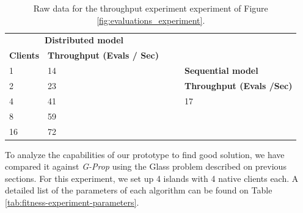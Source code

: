 \begin{table}[h!]
\centering
\begin{tabular}{|l|l|lll}
\cline{1-2}
\multicolumn{2}{|c|}{\textbf{Distributed model}}                          &           &                       & \textbf{}                                             \\ \cline{1-2}
\textbf{Clients} & \multicolumn{1}{c|}{\textbf{Throughput (Evals / Sec)}} &           &                       & \textbf{}                                             \\ \cline{1-2} \cline{5-5} 
1                & 14                                                     & \textbf{} & \multicolumn{1}{l|}{} & \multicolumn{1}{l|}{\textbf{Sequential model}}        \\ \cline{1-2} \cline{5-5} 
2                & 23                                                     &           & \multicolumn{1}{l|}{} & \multicolumn{1}{l|}{\textbf{Throughput (Evals /Sec)}} \\ \cline{1-2} \cline{5-5} 
4                & 41                                                     &           & \multicolumn{1}{l|}{} & \multicolumn{1}{l|}{17}                               \\ \cline{1-2} \cline{5-5} 
8                & 59                                                     &           &                       &                                                       \\ \cline{1-2}
16               & 72                                                     &           &                       &                                                       \\ \cline{1-2}
\end{tabular}
\caption{Raw data for the throughput experiment experiment of Figure \ref{fig:evaluations_experiment}.}
\label{tab:evaluations_experiment}
\end{table}

To analyze the capabilities of our prototype to find good solution, we have compared it against \textit{G-Prop} \cite{gprop} using the Glass problem described on previous sections. For this experiment, we set up 4 islands with 4 native clients each. A detailed list of the parameters of each algorithm can be found on Table \ref{tab:fitness-experiment-parameters}.

